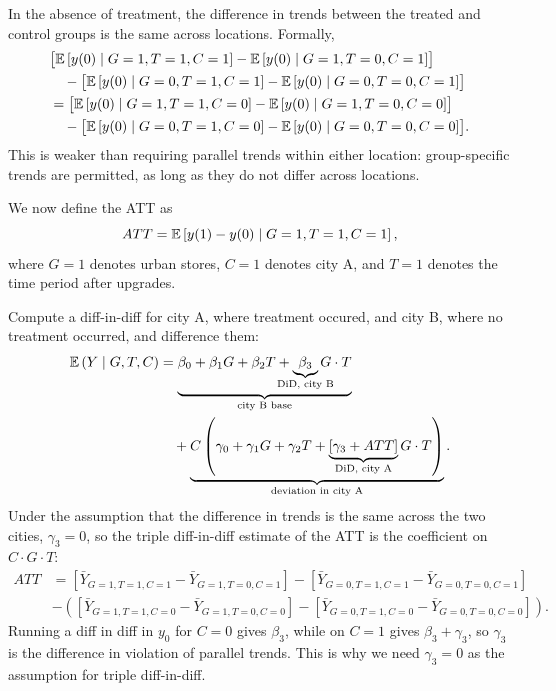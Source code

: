 \begin{assumption}
	In the absence of treatment, the difference in trends between the treated and control groups is the same across locations. Formally,
	\begin{align*}
		&\bigl[\mathbb{E}\left[y(0)\mid G=1,T=1,C=1\right] - \mathbb{E}\left[y(0)\mid G=1,T=0,C=1\right]\bigr] \\
		&\quad - \bigl[\mathbb{E}\left[y(0)\mid G=0,T=1,C=1\right] - \mathbb{E}\left[y(0)\mid G=0,T=0,C=1\right]\bigr] \\
		&= \bigl[\mathbb{E}\left[y(0)\mid G=1,T=1,C=0\right] - \mathbb{E}\left[y(0)\mid G=1,T=0,C=0\right]\bigr] \\
		&\quad - \bigl[\mathbb{E}\left[y(0)\mid G=0,T=1,C=0\right] - \mathbb{E}\left[y(0)\mid G=0,T=0,C=0\right]\bigr].
	\end{align*}
	This is weaker than requiring parallel trends within either location: group-specific trends are permitted, as long as they do not differ across locations.
\end{assumption}

\begin{proposition}
	We now define the ATT as
	\[
		ATT = \mathbb{E}\left[y(1)-y(0) \mid G=1, T=1, C=1\right]
	,\]
	where $G=1$ denotes urban stores, $C=1$ denotes city A, and $T=1$ denotes the time period after upgrades.

	Compute a diff-in-diff for city A, where treatment occured, and city B, where no treatment occurred, and difference them:
	\begin{align*}
		\E\left(Y \mid G, T, C\right)
		&= \underbrace{\beta_0 + \beta_1 G + \beta_2 T + \underbrace{\beta_3}_{\mathclap{\text{DiD, city B}}} G \cdot T}_{\text{city B base}} \\
		& \quad+ \underbrace{C\left(\gamma_0 + \gamma_1 G + \gamma_2 T + \underbrace{\left[\gamma_3 + ATT\right]}_{\mathclap{\text{DiD, city A}}}G \cdot T\right)}_{\text{deviation in city A}}
	.\end{align*}
	Under the assumption that the difference in trends is the same across the two cities, $\gamma_3 = 0$, so the triple diff-in-diff estimate of the ATT is the coefficient on $C \cdot G \cdot T$:
	\begin{align*}
		ATT &=
		\left[\bar{Y}_{G=1,T=1,C=1} - \bar{Y}_{G=1,T=0,C=1}\right]
		- \left[\bar{Y}_{G=0,T=1,C=1} - \bar{Y}_{G=0,T=0,C=1}\right]
		 \\ &- \left(
		\left[\bar{Y}_{G=1,T=1,C=0} - \bar{Y}_{G=1,T=0,C=0}\right]
		- \left[\bar{Y}_{G=0,T=1,C=0} - \bar{Y}_{G=0,T=0,C=0}\right]
		\right)
	.\end{align*}
	Running a diff in diff in $y_0$ for $C=0$ gives $\beta_3$, while on $C=1$ gives $\beta_3 + \gamma_3$, so $\gamma_3$ is the difference in violation of parallel trends. This is why we need $\gamma_3 = 0$ as the assumption for triple diff-in-diff.
\end{proposition}

